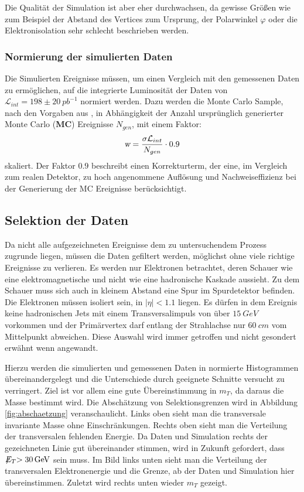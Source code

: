 \documentclass[a4paper,12pt]{article}
\newcommand{\met}{\ensuremath{\not\mathrel{E}}_T}
\begin{document}
Die Qualität der Simulation ist aber eher durchwachsen, da gewisse Größen wie zum Beispiel der
Abstand des Vertices zum Ursprung, der Polarwinkel $φ$ oder die Elektronisolation sehr schlecht
beschrieben werden.

\subsubsection*{Normierung der simulierten Daten}
Die Simulierten Ereignisse müssen, um einen Vergleich mit den gemessenen Daten zu ermöglichen, auf die
integrierte Luminosität der Daten von $\mathcal{L}_{int}=198 \pm \SI{20}{pb^{-1}}$ normiert werden.
Dazu werden die Monte Carlo Sample, nach den Vorgaben aus \cite{versuchsanleitung},
in Abhängigkeit der Anzahl ursprünglich generierter Monte Carlo (\textbf{MC}) Ereignisse $N_{gen}$, mit einem Faktor:
\begin{align*}
	\textsl{w}= \frac{\sigma \mathcal{L}_{int}}{N_{gen}} \cdot 0.9
\end{align*}
skaliert. Der Faktor $0.9$ beschreibt einen Korrekturterm, der eine, im Vergleich zum realen Detektor,
zu hoch angenommene Auflösung und Nachweiseffizienz bei der Generierung der MC Ereignisse berücksichtigt.

\subsection{Selektion der Daten}
Da nicht alle aufgezeichneten Ereignisse dem zu untersuchendem Prozess zugrunde liegen, müssen die
Daten gefiltert werden, möglichst ohne viele richtige Ereignisse zu verlieren. Es werden nur
Elektronen betrachtet, deren Schauer wie eine elektromagnetische und nicht wie eine hadronische
Kaskade aussieht. Zu dem Schauer muss sich auch in kleinem Abstand eine Spur im Spurdetektor befinden.
Die Elektronen müssen isoliert sein, in $|\eta| < 1.1$ liegen. Es dürfen in dem Ereignis keine
hadronischen Jets mit einem Transversalimpuls von über $\SI{15}{GeV}$ vorkommen und der Primärvertex
darf entlang der Strahlachse nur $\SI{60}{cm}$ vom Mittelpunkt abweichen. Diese Auswahl wird immer
getroffen und nicht gesondert erwähnt wenn angewandt.

Hierzu werden die simulierten und gemessenen Daten in normierte Histogrammen übereinandergelegt
und die Unterschiede durch geeignete Schnitte versucht zu verringert. Ziel ist vor allem eine gute
Übereinstimmung in $m_T$, da daraus die Masse bestimmt wird. Die Abschätzung von Selektionsgrenzen
wird in Abbildung \ref{fig:abschaetzung} veranschaulicht. Links oben sieht man die transversale
invariante Masse ohne Einschränkungen. Rechts oben sieht man die Verteilung der transversalen
fehlenden Energie. Da Daten und Simulation rechts der gezeichneten Linie gut übereinander stimmen,
wird in Zukunft gefordert, dass $\met > \SI{30}{GeV}$ sein muss. Im Bild links unten sieht man die
Verteilung der transversalen Elektronenergie und die Grenze, ab der Daten und Simulation hier
übereinstimmen. Zuletzt wird rechts unten wieder $m_T$ gezeigt.
\end{document}
